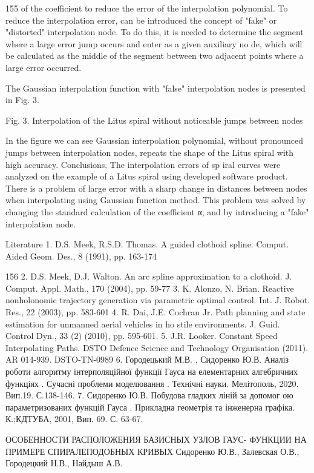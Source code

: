 \documentclass[12pt,a4paper]{article}
\begin{document}
155 of the coefficient to reduce the error of the interpolation polynomial. To reduce the interpolation error, can be introduced the concept of "fake" or "distorted" interpolation node. To do this, it is needed to determine the segment where a large error jump occurs and enter as a given auxiliary no de, which will be calculated as the middle of the segment between two adjacent points where a large error occurred.
\par
The Gaussian interpolation function with "false" interpolation nodes is presented in Fig. 3.
\par
Fig. 3. Interpolation of the Litus spiral without noticeable jumps between nodes
\par
In the figure we can see Gaussian interpolation polynomial, without pronounced jumps between interpolation nodes, repeats the shape of the Litus spiral with high accuracy. Conclusions. The interpolation errors of sp iral curves were analyzed on the example of a Litus spiral using developed software product. There is a problem of large error with a sharp change in distances between nodes when interpolating using Gaussian function method. This problem was solved by changing the standard calculation of the coefficient α, and by introducing a "fake" interpolation node.
\par
Literature 1. D.S. Meek, R.S.D. Thomas. A guided clothoid spline. Comput. Aided Geom. Des., 8 (1991), pp. 163-174
\par
156 2. D.S. Meek, D.J. Walton. An arc spline approximation to a clothoid. J. Comput. Appl. Math., 170 (2004), pp. 59-77 3. K. Alonzo, N. Brian. Reactive nonholonomic trajectory generation via parametric optimal control. Int. J. Robot. Res., 22 (2003), pp. 583-601 4. R. Dai, J.E. Cochran Jr. Path planning and state estimation for unmanned aerial vehicles in ho stile environments. J. Guid. Control Dyn., 33 (2) (2010), pp. 595-601. 5. J.R. Looker. Constant Speed Interpolating Paths. DSTO Defence Science and Technology Organisation (2011). AR 014-939. DSTO-TN-0989 6. Городецький М.В. , Сидоренко Ю.В. Аналіз роботи алгоритму інтерполяційної функції Гауса на елементарних алгебричних функціях . Сучасні проблеми моделювання . Технічні науки. Мелітополь, 2020. Вип.19. С.138-146. 7. Сидоренко Ю.В. Побудова гладких ліній за допомог ою параметризованих функцій Гауса . Прикладна геометрія та інженерна графіка. К.;КДТУБА, 2001, Вип. 69. С. 63-67.
\par
ОСОБЕННОСТИ РАСПОЛОЖЕНИЯ БАЗИСНЫХ УЗЛОВ ГАУС- ФУНКЦИИ НА ПРИМЕРЕ СПИРАЛЕПОДОБНЫХ КРИВЫХ Сидоренко Ю.В., Залевская О.В., Городецкий Н.В., Найдыш А.В.
\end{document}
